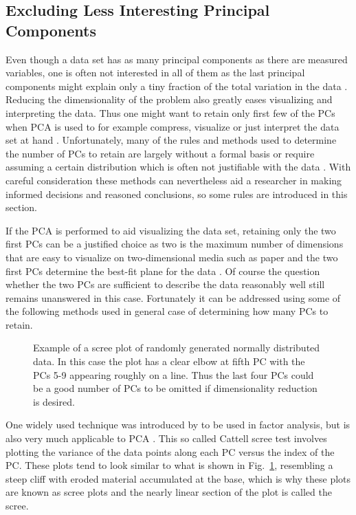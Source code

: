 \documentclass[english, oneside]{HYgradu}
\begin{document}
\subsection{Excluding Less Interesting Principal Components}
Even though a data set has as many principal components as there are measured variables, one is often not interested in all of them as the last principal components might explain only a tiny fraction of the total variation in the data \citep{james2013introduction}. Reducing the dimensionality of the problem also greatly eases visualizing and interpreting the data. Thus one might want to retain only first few of the PCs when PCA is used to for example compress, visualize or just interpret the data set at hand \citep{james2013introduction, johnson2007applied}. Unfortunately, many of the rules and methods used to determine the number of PCs to retain are largely without a formal basis or require assuming a certain distribution which is often not justifiable with the data \citep{jolliffe2002principal}. With careful consideration these methods can nevertheless aid a researcher in making informed decisions and reasoned conclusions, so some rules are introduced in this section.

If the PCA is performed to aid visualizing the data set, retaining only the two first PCs can be a justified choice as two is the maximum number of dimensions that are easy to visualize on two-dimensional media such as paper and the two first PCs determine the best-fit plane for the data \citep{jolliffe2002principal}. Of course the question whether the two PCs are sufficient to describe the data reasonably well still remains unanswered in this case. Fortunately it can be addressed using some of the following methods used in general case of determining how many PCs to retain.

\begin{figure}
    \centering
    
    \caption{Example of a scree plot of randomly generated normally distributed data. In this case the plot has a clear elbow at fifth PC with the PCs 5-9 appearing roughly on a line. Thus the last four PCs could be a good number of PCs to be omitted if dimensionality reduction is desired.}\label{fig:scree}
\end{figure}

One widely used technique was introduced by \citet{cattell1966scree} to be used in factor analysis, but is also very much applicable to PCA \citep{jolliffe2002principal}. This so called Cattell scree test involves plotting the variance of the data points along each PC versus the index of the PC. These plots tend to look similar to what is shown in Fig.\ \ref{fig:scree}, resembling a steep cliff with eroded material accumulated at the base, which is why these plots are known as scree plots and the nearly linear section of the plot is called the scree.
\end{document}
